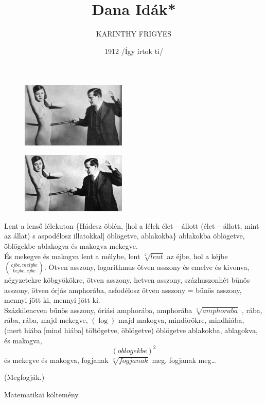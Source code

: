 \documentclass  [12pt]{article}
\author {KARINTHY FRIGYES}
\date{1912   /Így írtok ti/}
\title{Dana Idák*  }
\begin{document}
\begin{titlepage}
    \maketitle
\end{titlepage}




\begin{figure}
\begin{center}
\includegraphics[angle=5, width=5cm]{igy_irtok_ti.jpeg}
\end{center}
\end{figure}


\begin{figure}
\begin{center}
\includegraphics[angle=5, width=5cm]{Frici1.png}
\end{center}
\end{figure}


Lent a lenső lélekuton \{Hádesz öblén, [hol a lélek élet – állott (élet – állott, mint az állat) s aspodélosz illatokkal] öblögetve, ablakokba\} ablakokba öblögetve, öblögekbe ablakogva és makogva mekegve.\\
És mekegve és makogva lent a mélybe, lent $ \sqrt[2]{lent}  $ az éjbe, hol a kéjbe $ {ejbe,melybe \choose   kejbe,ejbe} $.
Ötven asszony, logarithmus ötven asszony és emelve és kivonva, négyzetekre köbgyökökre, ötven asszony, hetven asszony, százhuszonhét bűnös asszony, ötven órjás amphorába, asfodélosz ötven asszony = bünös asszony, mennyi jött ki, mennyi jött ki.\\
Százkilencven bűnös asszony, óriási amphorába, amphorába \begin{math} \sqrt[2]{amphoraba} \end{math} , rába, rába, rába, majd mekegve, $(\log) $ majd makogva, mindörökre, mindhiába, (mert hiába [mind hiába] töltögetve, öblögetve) öblögetve ablakokba, ablagokva, és makogva,\begin{displaymath} (oblogekbe)^{2} \end{displaymath} és mekegve és makogva, fogjanak $ \sqrt[2]{fogjanak} $ meg, fogjanak meg…\\

\begin{center}
(Megfogják.)
\end{center}

\tiny *Matematikai költemény.
\end{document}
